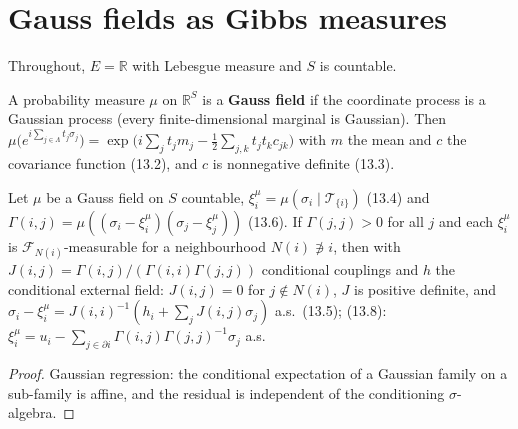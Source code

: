 \section{Gauss fields as Gibbs measures}

Throughout, $E = \mathbb R$ with Lebesgue measure and $S$ is countable.

\begin{definition}
    \label{def:gf-13-1}
    \leanok

    A probability measure $\mu$ on $\mathbb R^S$ is a \textbf{Gauss field} if the coordinate
    process is a Gaussian process (every finite-dimensional marginal is Gaussian). Then
    $\mu\bigl(e^{i\sum_{j\in\Lambda} t_j\sigma_j}\bigr) = \exp\bigl(i\sum_j t_j m_j - \tfrac12\sum_{j,k} t_j t_k c_{jk}\bigr)$
    with $m$ the mean and $c$ the covariance function (13.2), and $c$ is nonnegative definite (13.3).
\end{definition}

\begin{theorem}
    \label{thm:gf-13-7}
    \leanok

    Let $\mu$ be a Gauss field on $S$ countable, $\xi_i^\mu = \mu(\sigma_i \mid \mathcal T_{\{i\}})$
    (13.4) and $\Gamma(i,j) = \mu((\sigma_i - \xi_i^\mu)(\sigma_j - \xi_j^\mu))$ (13.6). If
    $\Gamma(j,j) > 0$ for all $j$ and each $\xi_i^\mu$ is $\mathcal F_{N(i)}$-measurable for a
    neighbourhood $N(i) \not\ni i$, then with $J(i,j) = \Gamma(i,j)/(\Gamma(i,i)\Gamma(j,j))$
    conditional couplings and $h$ the conditional external field: $J(i,j) = 0$ for
    $j \notin N(i)$, $J$ is positive definite, and $\sigma_i - \xi_i^\mu = J(i,i)^{-1}(h_i + \sum_j J(i,j)\sigma_j)$
    a.s.\ (13.5); (13.8): $\xi_i^\mu = u_i - \sum_{j \in \partial i}\Gamma(i,j)\Gamma(j,j)^{-1}\sigma_j$ a.s.
\end{theorem}
\begin{proof}
    \leanok
    Gaussian regression: the conditional expectation of a Gaussian family on a sub-family is
    affine, and the residual is independent of the conditioning $\sigma$-algebra.
\end{proof}


